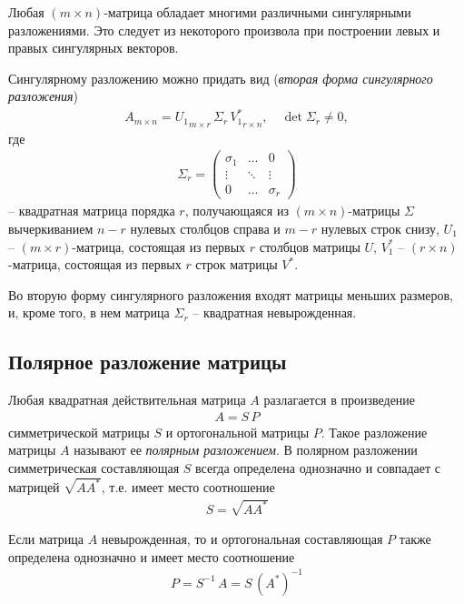 \documentclass[%
	11pt,
	a4paper,
	utf8,
		]{article}
\begin{document}
Любая $ (m \times n) $-матрица обладает многими различными сингулярными разложениями. Это следует из некоторого произвола при построении левых и правых сингулярных векторов.

Сингулярному разложению можно придать вид (\emph{вторая форма сингулярного разложения})
\begin{align*}
	A_{m \times n} = {U_1}_{m \times r} \, \Sigma_r \, {V_1^*}_{r \times n}, \quad \det \Sigma_r \neq 0,
\end{align*}
где
\begin{align*}
	\Sigma_r = \begin{pmatrix}
		\sigma_1 & \ldots & 0 \\
		\vdots & \ddots & \vdots \\
		0 & \ldots & \sigma_r
	\end{pmatrix}
\end{align*}
-- квадратная матрица порядка $ r $, получающаяся из $ (m \times n) $-матрицы $ \Sigma $ вычеркиванием $ n - r $ нулевых столбцов справа и $ m - r $ нулевых строк снизу,  $ U_1 $ -- $ (m \times r) $-матрица, состоящая из первых $ r $ столбцов матрицы $ U $, $ V_1^* $ -- $ (r \times n) $-матрица, состоящая из первых $ r $ строк матрицы $ V^* $.

Во вторую форму сингулярного разложения входят матрицы меньших размеров, и, кроме того, в нем матрица $ \Sigma_r $ -- квадратная невырожденная.

\subsection{Полярное разложение матрицы}

Любая квадратная действительная матрица $ A $ разлагается в произведение
\begin{align*}
	A = S \, P
\end{align*}
симметрической матрицы $ S $ и ортогональной матрицы $ P $. Такое разложение матрицы $ A $ называют ее \emph{полярным разложением}. В полярном разложении симметрическая составляющая $ S $ всегда определена однозначно и совпадает с матрицей $ \sqrt{ A A^*} $, т.е. имеет место соотношение
\begin{align*}
	S = \sqrt{A A^*}
\end{align*}

Если матрица $ A $ невырожденная, то и ортогональная составляющая $ P $ также определена однозначно и имеет место соотношение
\begin{align*}
	P = S^{-1} \, A = S \, (A^*)^{-1}
\end{align*}
\end{document}
